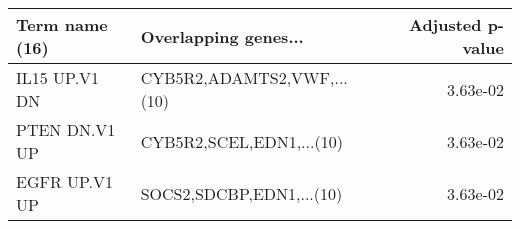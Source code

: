 \begin{tabular}{llr}
\toprule
Term name (16) &       Overlapping genes... &  Adjusted p-value \\
\midrule
 IL15 UP.V1 DN & CYB5R2,ADAMTS2,VWF,...(10) &          3.63e-02 \\
 PTEN DN.V1 UP &   CYB5R2,SCEL,EDN1,...(10) &          3.63e-02 \\
 EGFR UP.V1 UP &   SOCS2,SDCBP,EDN1,...(10) &          3.63e-02 \\
\bottomrule
\end{tabular}

